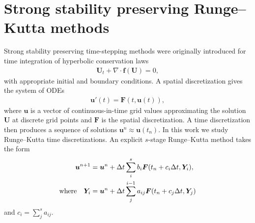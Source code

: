\section{Strong stability preserving Runge--Kutta methods}\label{sec:SSP}
Strong stability preserving time-stepping methods were originally introduced
for time integration of hyperbolic conservation laws
\cite{Shu/Osher:1988} 
\begin{align}\label{eq:ode_system}
	\bm{U}_t + \nabla \cdot \bm{f}(\bm{U}) = 0,   
\end{align}
with appropriate initial and boundary conditions.
A spatial discretization gives the system of ODEs
\begin{align*}
    \bm{u}'(t) = \bm{F}(t,\bm{u}(t)),
\end{align*}
where $\bm{u}$ is a vector of continuous-in-time grid values approximating 
the solution $\bm{U}$ at discrete grid points and $\bm{F}$ is the spatial 
discretization. 
A time discretization then produces a sequence of solutions
$\bm{u}^{n} \approx \bm{u}(t_n)$.
In this work we study Runge--Kutta time discretizations.
An explicit $s$-stage Runge--Kutta method takes the form
\begin{align*}
	\bm{u}^{n+1} &= \bm{u}^{n} + \Delta t \sum_i^s b_i \bm{F}(t_n + c_i \Delta t,\bm{Y}_i), \\
	\text{where} \quad \bm{Y}_i &= \bm{u}^{n} + \Delta t \sum_j^{i-1} a_{ij} \bm{F}(t_n + c_j \Delta t,\bm{Y}_j)
\end{align*}
and $c_i = \sum_j^sa_{ij}$.

